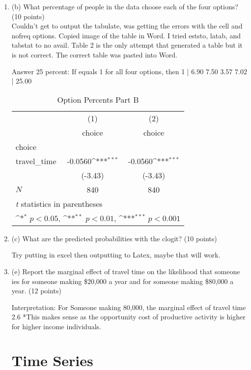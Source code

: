 \documentclass{article}
\begin{document}
\begin{enumerate}[label=\alph*]
\item

(b) What percentage of people in the data choose each of the four options? (10 points)\\

Couldn't get to output the tabulate, was getting the errors with the cell and nofreq options. Copied image of the table in Word. I tried eststo, latab, and tabstat to no avail. Table 2 is the only attempt that generated a table but it is not correct. The correct table was pasted into Word.\

Answer 25 percent: If equals 1 for all four options, then  1 |   6.90   7.50  3.57  7.02 |  25.00 

\begin{table}[htbp]\centering
\def\sym#1{\ifmmode^{#1}\else\(^{#1}\)\fi}
\caption{Option Percents Part B}
\begin{tabular}{l*{2}{c}}
\hline\hline
            &\multicolumn{1}{c}{(1)}&\multicolumn{1}{c}{(2)}\\
            &\multicolumn{1}{c}{choice}&\multicolumn{1}{c}{choice}\\
\hline
choice      &                     &                     \\
travel\_time &     -0.0560\sym{***}&     -0.0560\sym{***}\\
            &     (-3.43)         &     (-3.43)         \\
\hline
\(N\)       &         840         &         840         \\
\hline\hline
\multicolumn{3}{l}{\footnotesize \textit{t} statistics in parentheses}\\
\multicolumn{3}{l}{\footnotesize \sym{*} \(p<0.05\), \sym{**} \(p<0.01\), \sym{***} \(p<0.001\)}\\
\end{tabular}
\end{table}



\item
(c) What are the predicted probabilities with the clogit? (10 points)

Try putting in excel then outputting to Latex, maybe that will work. 


\item 
(e) Report the marginal effect of travel time on the likelihood that someone 
ies for
someone making \$20,000 a year and for someone making \$80,000 a year. (12
points)


Interpretation: For Someone making 80,000, the marginal effect of travel time 2.6%
*This makes sense as the opportunity cost of productive activity is higher for higher income individuals.

\section{Time Series}

\end{enumerate}
\end{document}
